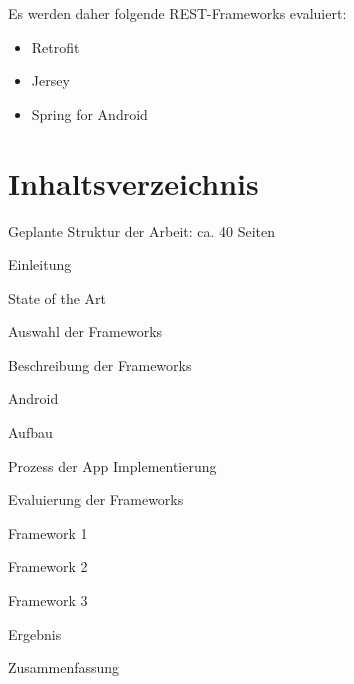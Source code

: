 \documentclass[a4paper,11pt,german,public]{INSOexpose}
\begin{document}
\begin{figure}[!htbp]
	\centering	
\end{figure}

Es werden daher folgende REST-Frameworks evaluiert:

\begin{itemize}
	\item Retrofit 
	\item Jersey
	\item Spring for Android
\end{itemize}

\section{Inhaltsverzeichnis}
Geplante Struktur der Arbeit: ca. 40 Seiten	
\begin{samepage}
  \begin{contentstructure}
    \item Einleitung	
    \item State of the Art 
    \begin{contentstructure}
      \item Auswahl der Frameworks 
      \item Beschreibung der Frameworks 
    \end{contentstructure}
    \item Android 
    \begin{contentstructure}
      \item Aufbau 
      \item Prozess der App Implementierung 
    \end{contentstructure}
    \item Evaluierung der Frameworks 
    \begin{contentstructure}
      \item Framework 1	
      \item Framework 2 
      \item Framework 3 
    \end{contentstructure}
    \item Ergebnis 
    \item Zusammenfassung 
  \end{contentstructure}
\end{samepage}
\end{document}
